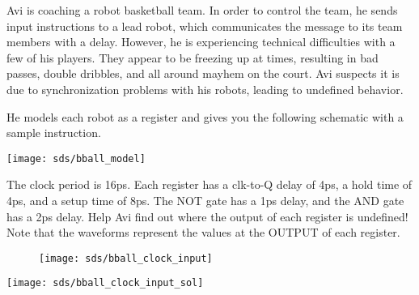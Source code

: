 \question
Avi is coaching a robot basketball team. In order to control the team, he sends input instructions to a lead robot, which communicates the message to its team members with a delay. However, he is experiencing technical difficulties with a few of his players. They appear to be freezing up at times, resulting in bad passes, double dribbles, and all around mayhem on the court. Avi suspects it is due to synchronization problems with his robots, leading to undefined behavior.

He models each robot as a register and gives you the following schematic with a sample instruction.

\texttt{[image: sds/bball\_model]}

The clock period is 16ps. Each register has a clk-to-Q delay of 4ps, a hold time of 4ps, and a setup time of 8ps. The NOT gate has a 1ps delay, and the AND gate has a 2ps delay. Help Avi find out where the output of each register is undefined!
Note that the waveforms represent the values at the OUTPUT of each register.


\begin{figure}\nopagebreak
\texttt{[image: sds/bball\_clock\_input]}\nopagebreak
\end{figure}
\nopagebreak
\begin{solution}
\texttt{[image: sds/bball\_clock\_input\_sol]}
\end{solution}


